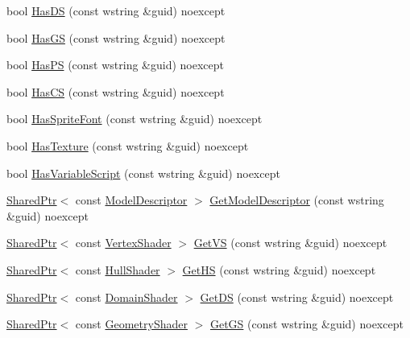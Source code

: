 \begin{DoxyCompactItemize}
\item 
bool \hyperlink{classmage_1_1_resource_manager_a9056d3cccb543acfbc48554adb80413e}{Has\+DS} (const wstring \&guid) noexcept
\item 
bool \hyperlink{classmage_1_1_resource_manager_aa93e710727fb3b6351317a7eddec376c}{Has\+GS} (const wstring \&guid) noexcept
\item 
bool \hyperlink{classmage_1_1_resource_manager_aa8bb9d0a4217bd02566583402a3241f8}{Has\+PS} (const wstring \&guid) noexcept
\item 
bool \hyperlink{classmage_1_1_resource_manager_a697c9c96fbf9d4f0382e769d4872aabb}{Has\+CS} (const wstring \&guid) noexcept
\item 
bool \hyperlink{classmage_1_1_resource_manager_a505a5b25923d88020d85a2f3307e4b7f}{Has\+Sprite\+Font} (const wstring \&guid) noexcept
\item 
bool \hyperlink{classmage_1_1_resource_manager_a617768fb9ec0c7c8f00b3f34c6386dfa}{Has\+Texture} (const wstring \&guid) noexcept
\item 
bool \hyperlink{classmage_1_1_resource_manager_a34d72d4729102af23d73438eea629e02}{Has\+Variable\+Script} (const wstring \&guid) noexcept
\item 
\hyperlink{namespacemage_a1e01ae66713838a7a67d30e44c67703e}{Shared\+Ptr}$<$ const \hyperlink{classmage_1_1_model_descriptor}{Model\+Descriptor} $>$ \hyperlink{classmage_1_1_resource_manager_a311d328f5a7cbb82da84815ee195c06f}{Get\+Model\+Descriptor} (const wstring \&guid) noexcept
\item 
\hyperlink{namespacemage_a1e01ae66713838a7a67d30e44c67703e}{Shared\+Ptr}$<$ const \hyperlink{classmage_1_1_vertex_shader}{Vertex\+Shader} $>$ \hyperlink{classmage_1_1_resource_manager_a76e1c55d7c2e7b95b2ef92ebc8fcf200}{Get\+VS} (const wstring \&guid) noexcept
\item 
\hyperlink{namespacemage_a1e01ae66713838a7a67d30e44c67703e}{Shared\+Ptr}$<$ const \hyperlink{namespacemage_a6705043f61391313d099f89ee3cc94ee}{Hull\+Shader} $>$ \hyperlink{classmage_1_1_resource_manager_a6b36abca958e92f7a3787598d9c13352}{Get\+HS} (const wstring \&guid) noexcept
\item 
\hyperlink{namespacemage_a1e01ae66713838a7a67d30e44c67703e}{Shared\+Ptr}$<$ const \hyperlink{namespacemage_ad5d9bb50a2b73d471275badcd9b2f155}{Domain\+Shader} $>$ \hyperlink{classmage_1_1_resource_manager_a8456ada6f4938fb1c8220cfe988ad8a7}{Get\+DS} (const wstring \&guid) noexcept
\item 
\hyperlink{namespacemage_a1e01ae66713838a7a67d30e44c67703e}{Shared\+Ptr}$<$ const \hyperlink{namespacemage_abb3c4ec904feaa4f076ab736f6bab40f}{Geometry\+Shader} $>$ \hyperlink{classmage_1_1_resource_manager_a66d1b171420e1a3310c6db5db88e3029}{Get\+GS} (const wstring \&guid) noexcept

\end{DoxyCompactItemize}
